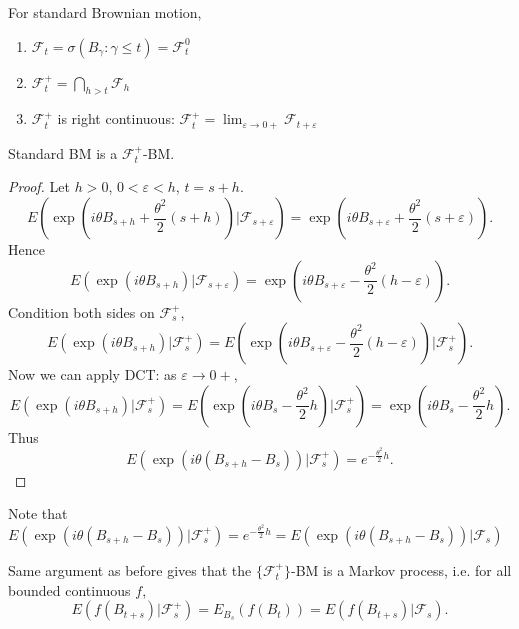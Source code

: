 
For standard Brownian motion,
\begin{enumerate}
	\item $\mathcal{F}_t = \sigma\left( B_\gamma: \gamma \le t \right) = \mathcal{F}_t^0$
	\item $\mathcal{F}_t^+ = \bigcap_{h > t} \mathcal{F}_h$
	\item $\mathcal{F}_t^+$ is right continuous: $\mathcal{F}_t^+ = \lim_{\varepsilon \to  0+} \mathcal{F}_{t + \varepsilon}$
\end{enumerate}
\begin{theorem}
	Standard BM is a $\mathcal{F}_t^+$-BM.
\end{theorem}
\begin{proof}
	Let $h >0$, $0<\varepsilon<h$, $t = s + h$.
	\[
		E\left( \exp\left( i \theta B_{s + h} + \frac{\theta^2}{2}(s + h) \right) | \mathcal{F}_{s + \varepsilon} \right) 
		= \exp\left(  i \theta B_{s + \varepsilon} + \frac{\theta^2}{2}(s + \varepsilon) \right) 
	.\] 
	Hence
	\[
		E\left( \exp\left( i \theta B_{s + h} \right) |\mathcal{F}_{s + \varepsilon} \right)  = \exp\left( i \theta B_{s + \varepsilon} - \frac{\theta^2}{2} (h - \varepsilon)\right)  
	.\] 
	Condition both sides on $\mathcal{F}_s^+$,
	\[
		E\left( \exp\left( i \theta B_{s + h} \right) |\mathcal{F}_s^+ \right) 
		= E\left( \exp\left( i \theta B_{s + \varepsilon} - \frac{\theta^2}{2}(h - \varepsilon) \right) |\mathcal{F}_s^+ \right) 
	.\] 
	Now we can apply DCT: as $\varepsilon \to 0+$,
\[
		E\left( \exp\left( i \theta B_{s + h} \right)| \mathcal{F}_s^+ \right) 
		= E\left( \exp\left( i \theta B_{s } - \frac{\theta^2}{2}h\right) |\mathcal{F}_s^+ \right) 
		=  \exp\left( i \theta B_{s } - \frac{\theta^2}{2}h\right)	
	.\]
	Thus
	\[
		E\left( \exp\left( i \theta \left( B_{s + h} - B_s \right)  \right) | \mathcal{F}_s^+ \right)  = e^{- \frac{\theta^2}{2}h}
	.\] 
\end{proof}

\begin{remark}
	Note that $E\left( \exp\left( i \theta (B_{s + h} - B_s) \right) | \mathcal{F}_s^+ \right) = e^{- \frac{\theta^2}{2}h} = E\left( \exp\left( i \theta \left( B_{s + h} - B_s \right)  \right) | \mathcal{F}_s \right)$


	Same argument as before gives that the $\{\mathcal{F}_t^+\} $-BM is a Markov process, i.e. for all bounded continuous $f$, 
	 \[
		E\left( f(B_{t + s}) |\mathcal{F}_s^+ \right) 
		= E_{B_s}\left( f(B_t) \right) 
		= E\left( f(B_{t + s}) | \mathcal{F}_s \right) 
	.\] 
\end{remark}

